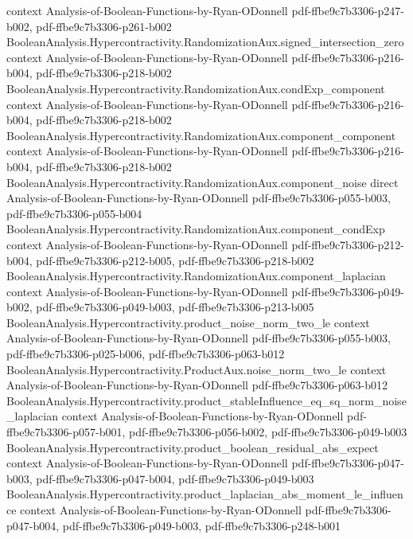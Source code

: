 \begin{theorem}
  {context}
  {Analysis-of-Boolean-Functions-by-Ryan-ODonnell}
  {pdf-ffbe9c7b3306-p247-b002,
    pdf-ffbe9c7b3306-p261-b002}
\proofstep
  {BooleanAnalysis.Hypercontractivity.RandomizationAux.signed_intersection_zero}
  {context}
  {Analysis-of-Boolean-Functions-by-Ryan-ODonnell}
  {pdf-ffbe9c7b3306-p216-b004,
    pdf-ffbe9c7b3306-p218-b002}
\proofstep
  {BooleanAnalysis.Hypercontractivity.RandomizationAux.condExp_component}
  {context}
  {Analysis-of-Boolean-Functions-by-Ryan-ODonnell}
  {pdf-ffbe9c7b3306-p216-b004,
    pdf-ffbe9c7b3306-p218-b002}
\proofstep
  {BooleanAnalysis.Hypercontractivity.RandomizationAux.component_component}
  {context}
  {Analysis-of-Boolean-Functions-by-Ryan-ODonnell}
  {pdf-ffbe9c7b3306-p216-b004,
    pdf-ffbe9c7b3306-p218-b002}
\proofstep
  {BooleanAnalysis.Hypercontractivity.RandomizationAux.component_noise}
  {direct}
  {Analysis-of-Boolean-Functions-by-Ryan-ODonnell}
  {pdf-ffbe9c7b3306-p055-b003,
    pdf-ffbe9c7b3306-p055-b004}
\proofstep
  {BooleanAnalysis.Hypercontractivity.RandomizationAux.component_condExp}
  {context}
  {Analysis-of-Boolean-Functions-by-Ryan-ODonnell}
  {pdf-ffbe9c7b3306-p212-b004,
    pdf-ffbe9c7b3306-p212-b005,
    pdf-ffbe9c7b3306-p218-b002}
\proofstep
  {BooleanAnalysis.Hypercontractivity.RandomizationAux.component_laplacian}
  {context}
  {Analysis-of-Boolean-Functions-by-Ryan-ODonnell}
  {pdf-ffbe9c7b3306-p049-b002,
    pdf-ffbe9c7b3306-p049-b003,
    pdf-ffbe9c7b3306-p213-b005}
\proofstep
  {BooleanAnalysis.Hypercontractivity.product_noise_norm_two_le}
  {context}
  {Analysis-of-Boolean-Functions-by-Ryan-ODonnell}
  {pdf-ffbe9c7b3306-p055-b003,
    pdf-ffbe9c7b3306-p025-b006,
    pdf-ffbe9c7b3306-p063-b012}
\proofstep
  {BooleanAnalysis.Hypercontractivity.ProductAux.noise_norm_two_le}
  {context}
  {Analysis-of-Boolean-Functions-by-Ryan-ODonnell}
  {pdf-ffbe9c7b3306-p063-b012}
\proofstep
  {BooleanAnalysis.Hypercontractivity.product_stableInfluence_eq_sq_norm_noise_laplacian}
  {context}
  {Analysis-of-Boolean-Functions-by-Ryan-ODonnell}
  {pdf-ffbe9c7b3306-p057-b001,
    pdf-ffbe9c7b3306-p056-b002,
    pdf-ffbe9c7b3306-p049-b003}
\proofstep
  {BooleanAnalysis.Hypercontractivity.product_boolean_residual_abs_expect}
  {context}
  {Analysis-of-Boolean-Functions-by-Ryan-ODonnell}
  {pdf-ffbe9c7b3306-p047-b003,
    pdf-ffbe9c7b3306-p047-b004,
    pdf-ffbe9c7b3306-p049-b003}
\proofstep
  {BooleanAnalysis.Hypercontractivity.product_laplacian_abs_moment_le_influence}
  {context}
  {Analysis-of-Boolean-Functions-by-Ryan-ODonnell}
  {pdf-ffbe9c7b3306-p047-b004,
    pdf-ffbe9c7b3306-p049-b003,
    pdf-ffbe9c7b3306-p248-b001}

\end{theorem}
